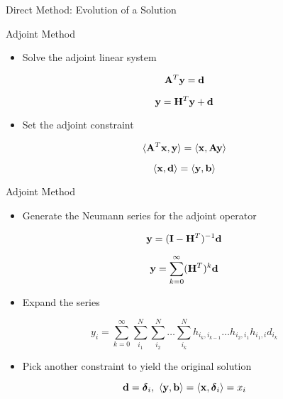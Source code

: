 \documentclass{beamer}
\begin{document}
\begin{frame}{Direct Method: Evolution of a Solution}

\end{frame}

\begin{frame}{Adjoint Method}

  \begin{itemize}
  \item Solve the adjoint linear system
  \end{itemize}

  \[
  \mathbf{A}^T \mathbf{y} = \mathbf{d}
  \]

  \[
  \mathbf{y} = \mathbf{H}^T \mathbf{y} + \mathbf{d}
  \]

  \begin{itemize}
  \item Set the adjoint constraint
  \end{itemize}

  \[
  \langle \mathbf{A}^T \mathbf{x}, \mathbf{y} \rangle = \langle \mathbf{x}, \mathbf{A}
  \mathbf{y} \rangle
  \]

  \[
  \langle \mathbf{x}, \mathbf{d} \rangle = \langle \mathbf{y}, \mathbf{b} \rangle
  \]
  
\end{frame}

\begin{frame}{Adjoint Method}

  \begin{itemize}
  \item Generate the Neumann series for the adjoint operator
  \end{itemize}

  \[
  \mathbf{y} = (\mathbf{I} - \mathbf{H}^T)^{-1} \mathbf{d}
  \]

  \[
  \mathbf{y} = \sum_{k=0}^{\infty} (\mathbf{H}^T)^k\mathbf{d}
  \]

  \begin{itemize}
  \item Expand the series
  \end{itemize}

  \[
  y_i = \sum_{k=0}^{\infty}\sum_{i_1}^{N}\sum_{i_2}^{N}\ldots
  \sum_{i_k}^{N}h_{i_k,i_{k-1}}\ldots h_{i_2,i_1} h_{i_1,i} d_{i_k}
  \]

  \begin{itemize}
  \item Pick another constraint to yield the original solution
  \end{itemize}

  \[
  \mathbf{d} = \boldsymbol{\delta}_i,\ \langle \mathbf{y}, \mathbf{b} \rangle =
  \langle \mathbf{x}, \boldsymbol{\delta}_i \rangle = x_i
  \]
  
\end{frame}
\end{document}

